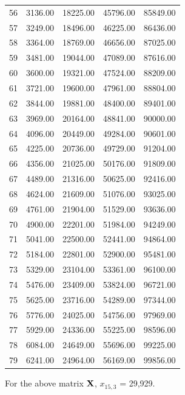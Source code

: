 \documentclass{amsart}
\begin{document}
\begin{center}
\begin{longtable}{|c|c|c|c|c|}
  56 & 3136.00 & 18225.00 & 45796.00 & 85849.00 \\
  57 & 3249.00 & 18496.00 & 46225.00 & 86436.00 \\
  58 & 3364.00 & 18769.00 & 46656.00 & 87025.00 \\
  59 & 3481.00 & 19044.00 & 47089.00 & 87616.00 \\
  60 & 3600.00 & 19321.00 & 47524.00 & 88209.00 \\
  61 & 3721.00 & 19600.00 & 47961.00 & 88804.00 \\
  62 & 3844.00 & 19881.00 & 48400.00 & 89401.00 \\
  63 & 3969.00 & 20164.00 & 48841.00 & 90000.00 \\
  64 & 4096.00 & 20449.00 & 49284.00 & 90601.00 \\
  65 & 4225.00 & 20736.00 & 49729.00 & 91204.00 \\
  66 & 4356.00 & 21025.00 & 50176.00 & 91809.00 \\
  67 & 4489.00 & 21316.00 & 50625.00 & 92416.00 \\
  68 & 4624.00 & 21609.00 & 51076.00 & 93025.00 \\
  69 & 4761.00 & 21904.00 & 51529.00 & 93636.00 \\
  70 & 4900.00 & 22201.00 & 51984.00 & 94249.00 \\
  71 & 5041.00 & 22500.00 & 52441.00 & 94864.00 \\
  72 & 5184.00 & 22801.00 & 52900.00 & 95481.00 \\
  73 & 5329.00 & 23104.00 & 53361.00 & 96100.00 \\
  74 & 5476.00 & 23409.00 & 53824.00 & 96721.00 \\
  75 & 5625.00 & 23716.00 & 54289.00 & 97344.00 \\
  76 & 5776.00 & 24025.00 & 54756.00 & 97969.00 \\
  77 & 5929.00 & 24336.00 & 55225.00 & 98596.00 \\
  78 & 6084.00 & 24649.00 & 55696.00 & 99225.00 \\
  79 & 6241.00 & 24964.00 & 56169.00 & 99856.00 \\
   \hline
\end{longtable}
\end{center}


For the above matrix $\bf{X}$, $x_{15, 3}$ = 29,929.
\end{document}
